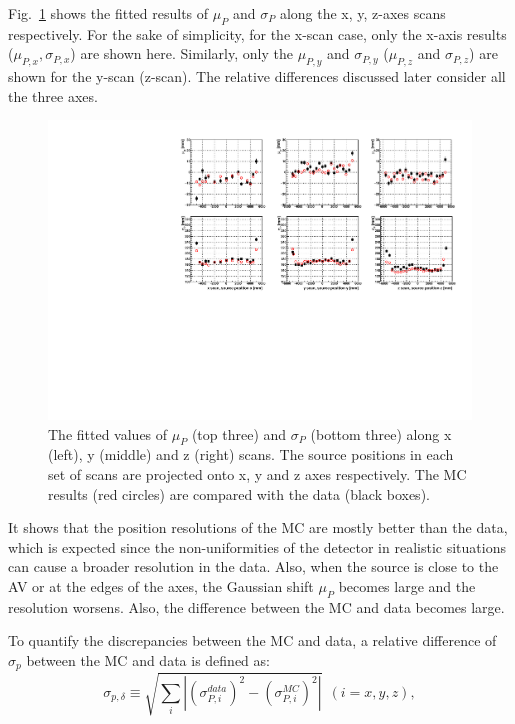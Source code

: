 Fig.~\ref{MPWscanXYZResols} shows the fitted results of $\mu_P$ and $\sigma_P$ along the x, y, z-axes scans respectively. For the sake of simplicity, for the x-scan case, only the x-axis results ($\mu_{P,x},\sigma_{P,x}$) are shown here. Similarly, only the $\mu_{P,y}$ and $\sigma_{P,y}$ ($\mu_{P,z}$ and $\sigma_{P,z}$) are shown for the y-scan (z-scan). The relative differences discussed later consider all the three axes.

\begin{figure}
	\centering
	\includegraphics[width=16cm]{N16_rat6176_muPandSigmaP_xyzScans.pdf}
	\caption{The fitted values of $\mu_P$ (top three) and $\sigma_P$ (bottom three) along x (left), y (middle) and z (right) scans. The source positions in each set of scans are projected onto x, y and z axes respectively. The MC results (red circles) are compared with the data (black boxes).}
	\label{MPWscanXYZResols}
\end{figure}

It shows that the position resolutions of the MC are mostly better than the data, which is expected since the non-uniformities of the detector in realistic situations can cause a broader resolution in the data\cite{waterunidoc}. Also, when the source is close to the AV or at the edges of the axes, the Gaussian shift $\mu_P$ becomes large and the resolution worsens. Also, the difference between the MC and data becomes large.

To quantify the discrepancies between the MC and data, a relative difference of $\sigma_p$ between the MC and data is defined as\cite{waterunidoc}:
\begin{equation}
\sigma_{p,\delta}\equiv\sqrt{\sum_i|(\sigma^{data}_{P,i})^2-(\sigma^{MC}_{P,i})^2|}~~(i=x,y,z),
\end{equation}
 
